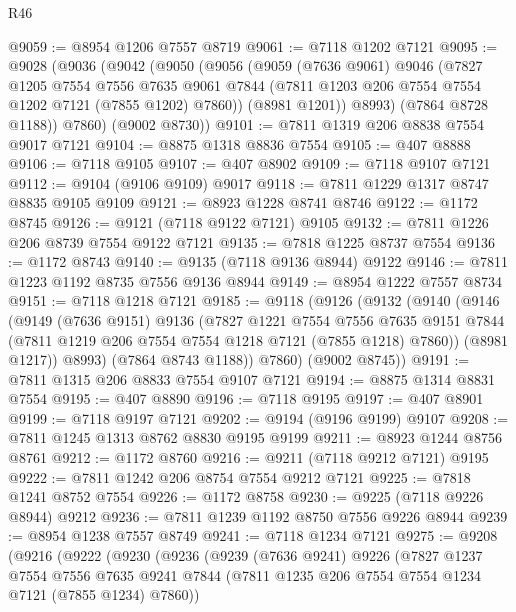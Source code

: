 \begin{lexlean}{R46}
\begin{coremodule}
@9059 := @8954 @1206 @7557 @8719
@9061 := @7118 @1202 @7121
@9095 := @9028
    (@9036
      (@9042
        (@9050
          (@9056
            (@9059
              (@7636 @9061)
              @9046
              (@7827
                @1205
                @7554
                @7556
                @7635
                @9061
                @7844
                (@7811 @1203 @206 @7554 @7554 @1202 @7121 (@7855 @1202) @7860))
              (@8981 @1201))
            @8993)
          (@7864 @8728 @1188))
        @7860)
      (@9002 @8730))
@9101 := @7811 @1319 @206 @8838 @7554 @9017 @7121
@9104 := @8875 @1318 @8836 @7554
@9105 := @407 @8888
@9106 := @7118 @9105
@9107 := @407 @8902
@9109 := @7118 @9107 @7121
@9112 := @9104 (@9106 @9109) @9017
@9118 := @7811 @1229 @1317 @8747 @8835 @9105 @9109
@9121 := @8923 @1228 @8741 @8746
@9122 := @1172 @8745
@9126 := @9121 (@7118 @9122 @7121) @9105
@9132 := @7811 @1226 @206 @8739 @7554 @9122 @7121
@9135 := @7818 @1225 @8737 @7554
@9136 := @1172 @8743
@9140 := @9135 (@7118 @9136 @8944) @9122
@9146 := @7811 @1223 @1192 @8735 @7556 @9136 @8944
@9149 := @8954 @1222 @7557 @8734
@9151 := @7118 @1218 @7121
@9185 := @9118
    (@9126
      (@9132
        (@9140
          (@9146
            (@9149
              (@7636 @9151)
              @9136
              (@7827
                @1221
                @7554
                @7556
                @7635
                @9151
                @7844
                (@7811 @1219 @206 @7554 @7554 @1218 @7121 (@7855 @1218) @7860))
              (@8981 @1217))
            @8993)
          (@7864 @8743 @1188))
        @7860)
      (@9002 @8745))
@9191 := @7811 @1315 @206 @8833 @7554 @9107 @7121
@9194 := @8875 @1314 @8831 @7554
@9195 := @407 @8890
@9196 := @7118 @9195
@9197 := @407 @8901
@9199 := @7118 @9197 @7121
@9202 := @9194 (@9196 @9199) @9107
@9208 := @7811 @1245 @1313 @8762 @8830 @9195 @9199
@9211 := @8923 @1244 @8756 @8761
@9212 := @1172 @8760
@9216 := @9211 (@7118 @9212 @7121) @9195
@9222 := @7811 @1242 @206 @8754 @7554 @9212 @7121
@9225 := @7818 @1241 @8752 @7554
@9226 := @1172 @8758
@9230 := @9225 (@7118 @9226 @8944) @9212
@9236 := @7811 @1239 @1192 @8750 @7556 @9226 @8944
@9239 := @8954 @1238 @7557 @8749
@9241 := @7118 @1234 @7121
@9275 := @9208
    (@9216
      (@9222
        (@9230
          (@9236
            (@9239
              (@7636 @9241)
              @9226
              (@7827
                @1237
                @7554
                @7556
                @7635
                @9241
                @7844
                (@7811 @1235 @206 @7554 @7554 @1234 @7121 (@7855 @1234) @7860))

\end{coremodule}
\end{lexlean}
